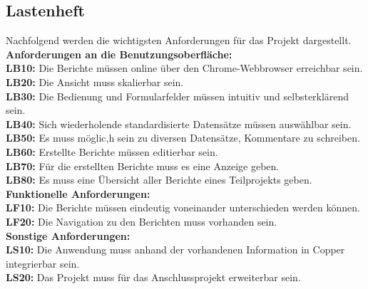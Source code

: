 \subsection{Lastenheft}
\label{sec:Lastenheft}
Nachfolgend werden die wichtigsten Anforderungen für das Projekt dargestellt.\\[1.5ex]
\textbf{Anforderungen an die Benutzungsoberfläche:}\\[1.5ex]
\textbf{LB10:} Die Berichte müssen online über den Chrome-Webbrowser erreichbar sein.\\
\textbf{LB20:} Die Ansicht muss skalierbar sein.\\
\textbf{LB30:} Die Bedienung und Formularfelder müssen intuitiv und selbsterklärend sein.\\
\textbf{LB40:} Sich wiederholende standardisierte Datensätze müssen auswählbar sein.\\
\textbf{LB50:} Es muss möglic,h sein zu diversen Datensätze, Kommentare zu schreiben.\\
\textbf{LB60:} Erstellte Berichte müssen editierbar sein.\\
\textbf{LB70:} Für die erstellten Berichte muss es eine Anzeige geben.\\
\textbf{LB80:} Es muss eine Übersicht aller Berichte eines Teilprojekts geben.\\[1.5ex]
\textbf{Funktionelle Anforderungen:}\\[1.5ex]
\textbf{LF10:} Die Berichte müssen eindeutig voneinander unterschieden werden können.\\
\textbf{LF20:} Die Navigation zu den Berichten muss vorhanden sein.\\[1.5ex]
\textbf{Sonstige Anforderungen:}\\[1.5ex]
\textbf{LS10:} Die Anwendung muss anhand der vorhandenen Information in Copper integrierbar sein.\\
\textbf{LS20:} Das Projekt muss für das Anschlussprojekt erweiterbar sein.

